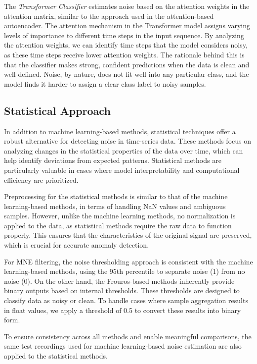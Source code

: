 The \emph{Transformer Classifier} estimates noise based on the attention weights in the attention matrix, similar to the approach used in the attention-based autoencoder. The attention mechanism in the Transformer model assigns varying levels of importance to different time steps in the input sequence. By analyzing the attention weights, we can identify time steps that the model considers noisy, as these time steps receive lower attention weights. The rationale behind this is that the classifier makes strong, confident predictions when the data is clean and well-defined. Noise, by nature, does not fit well into any particular class, and the model finds it harder to assign a clear class label to noisy samples.

\subsection{Statistical Approach}
In addition to machine learning-based methods, statistical techniques offer a robust alternative for detecting noise in time-series data. These methods focus on analyzing changes in the statistical properties of the data over time, which can help identify deviations from expected patterns. Statistical methods are particularly valuable in cases where model interpretability and computational efficiency are prioritized.

Preprocessing for the statistical methods is similar to that of the machine learning-based methods, in terms of handling NaN values and ambiguous samples. However, unlike the machine learning methods, no normalization is applied to the data, as statistical methods require the raw data to function properly. This ensures that the characteristics of the original signal are preserved, which is crucial for accurate anomaly detection.

For MNE filtering, the noise thresholding approach is consistent with the machine learning-based methods, using the 95th percentile to separate noise (1) from no noise (0). On the other hand, the Frouros-based methods inherently provide binary outputs based on internal thresholds. These thresholds are designed to classify data as noisy or clean. To handle cases where sample aggregation results in float values, we apply a threshold of 0.5 to convert these results into binary form.

To ensure consistency across all methods and enable meaningful comparisons, the same test recordings used for machine learning-based noise estimation are also applied to the statistical methods.

